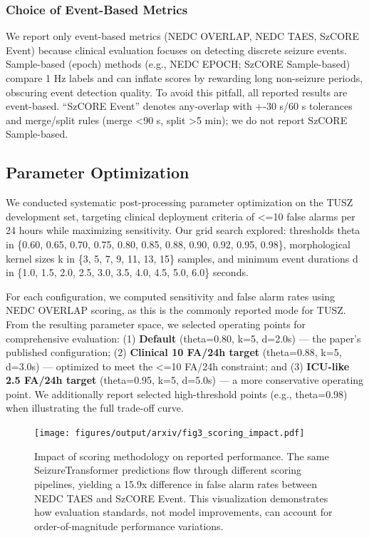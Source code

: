 \hypertarget{choice-of-event-based-metrics}{%
\subsubsection{Choice of Event-Based
Metrics}\label{choice-of-event-based-metrics}}

We report only event-based metrics (NEDC OVERLAP, NEDC TAES, SzCORE
Event) because clinical evaluation focuses on detecting discrete seizure
events. Sample-based (epoch) methods (e.g., NEDC EPOCH; SzCORE
Sample-based) compare 1 Hz labels and can inflate scores by rewarding
long non-seizure periods, obscuring event detection quality. To avoid
this pitfall, all reported results are event-based. ``SzCORE Event''
denotes any-overlap with +-30 s/60 s tolerances and merge/split rules
(merge \textless90 s, split \textgreater5 min); we do not report SzCORE
Sample-based.

\hypertarget{parameter-optimization}{%
\subsection{Parameter Optimization}\label{parameter-optimization}}

We conducted systematic post-processing parameter optimization on the
TUSZ development set, targeting clinical deployment criteria of
\textless=10 false alarms per 24 hours while maximizing sensitivity. Our
grid search explored: thresholds theta in \{0.60, 0.65, 0.70, 0.75,
0.80, 0.85, 0.88, 0.90, 0.92, 0.95, 0.98\}, morphological kernel sizes k
in \{3, 5, 7, 9, 11, 13, 15\} samples, and minimum event durations d in
\{1.0, 1.5, 2.0, 2.5, 3.0, 3.5, 4.0, 4.5, 5.0, 6.0\} seconds.

For each configuration, we computed sensitivity and false alarm rates
using NEDC OVERLAP scoring, as this is the commonly reported mode for
TUSZ. From the resulting parameter space, we selected operating points
for comprehensive evaluation: (1) \textbf{Default} (theta=0.80, k=5,
d=2.0s) --- the paper's published configuration; (2) \textbf{Clinical 10
FA/24h target} (theta=0.88, k=5, d=3.0s) --- optimized to meet the
\textless=10 FA/24h constraint; and (3) \textbf{ICU-like 2.5 FA/24h
target} (theta=0.95, k=5, d=5.0s) --- a more conservative operating
point. We additionally report selected high-threshold points (e.g.,
theta=0.98) when illustrating the full trade-off curve.

\begin{figure}
\hypertarget{fig:scoring-impact}{%
\centering
\texttt{[image: figures/output/arxiv/fig3\_scoring\_impact.pdf]}
\caption{Impact of scoring methodology on reported performance. The same
SeizureTransformer predictions flow through different scoring pipelines,
yielding a 15.9x difference in false alarm rates between NEDC TAES and
SzCORE Event. This visualization demonstrates how evaluation standards,
not model improvements, can account for order-of-magnitude performance
variations.}\label{fig:scoring-impact}
}
\end{figure}

